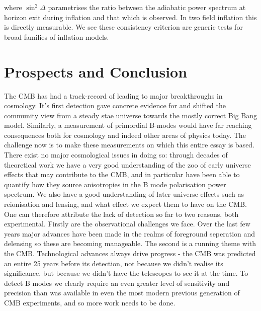 \documentclass[a4paper,10pt]{article}
\begin{document}
where $\sin^2\Delta$ parametrises the ratio between the adiabatic power spectrum at horizon exit during inflation and that which is observed. In two field inflation this is directly measurable. We see these consistency criterion are generic tests for broad families of inflation models.


\section{Prospects and Conclusion}

The CMB has had a track-record of leading to major breakthroughs in cosmology. It's first detection gave concrete evidence for and shifted the community view from a steady stae universe towards the mostly correct Big Bang model. Similarly, a measurement of primordial B-modes would have far reaching consequences both for cosmology and indeed other areas of physics today. The challenge now is to make these measurements on which this entire essay is based. There exist no major cosmological issues in doing so: through decades of theoretical work we have a very good understanding of the zoo of early universe effects that may contribute to the CMB, and in particular have been able to quantify how they source anisotropies in the B mode polarisation power spectrum. We also have a good understanding of later universe effects such as reionisation and lensing, and what effect we expect them to have on the CMB. \\

One can therefore attribute the lack of detection so far to two reasons, both experimental. Firstly are the observational challenges we face. Over the last few years major advances have been made in the realms of foreground seperation and delensing so these are becoming manageable. The second is a running theme with the CMB. Technological advances always drive progress - the CMB was predicted an entire 25 years before its detection, not because we didn't realise its significance, but because we didn't have the telescopes to see it at the time. To detect B modes we clearly require an even greater level of sensitivity and precision than was available in even the most modern previous generation of CMB experiments, and so more work needs to be done.\\
\end{document}
